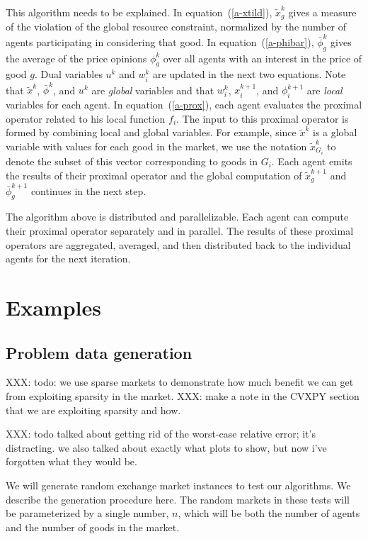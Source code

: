 \documentclass[12pt]{article}
\begin{document}
This algorithm needs to be explained. In equation~(\ref{a-xtild}),
$\tilde{x}^k_g$ gives a measure of the violation of the global resource
constraint, normalized by the number of agents participating in considering
that good. In equation~(\ref{a-phibar}), $\bar{\phi}^k_g$ gives the average of
the price opinions $\phi^k_g$ over all agents with an interest in the price of
good $g$. Dual variables $u^k$ and $w^k_i$ are updated in the next two
equations. Note that $\tilde{x}^k$, $\bar{\phi}^k$, and $u^k$ are \emph{global}
variables and that $w_i^k$, $x_i^{k+1}$, and $\phi_i^{k+1}$ are \emph{local}
variables for each agent. In equation~(\ref{a-prox}), each agent evaluates the
proximal operator related to his local function $f_i$. The input to this
proximal operator is formed by combining local and global variables. For
example, since $\tilde{x}^k$ is a global variable with values for each good in
the market, we use the notation $\tilde{x}^k_{G_i}$ to denote the subset of
this vector corresponding to goods in $G_i$. Each agent emits the results of
their proximal operator and the global computation of $\tilde{x}^{k+1}_g$ and
$\bar{\phi}^{k+1}_g$ continues in the next step.

The algorithm above is distributed and parallelizable. Each agent can compute
their proximal operator separately and in parallel. The results of these
proximal operators are aggregated, averaged, and then distributed back to the
individual agents for the next iteration.


\section{Examples}
\label{sec:examples}
\subsection{Problem data generation}
\label{sec:random_prob}

XXX: todo: we use sparse markets to demonstrate how much benefit we can get from
exploiting sparsity in the market. XXX: make a note in the CVXPY section that
we are exploiting sparsity and how.

XXX: todo talked about getting rid of the worst-case relative error; it’s distracting.
we also talked about exactly what plots to show, but now i’ve forgotten what
they would be.


We will generate random exchange market instances to test our algorithms. We
describe the generation procedure here. The random markets in these tests will
be parameterized by a single number, $n$, which will be both the number of
agents and the number of goods in the market.
\end{document}
